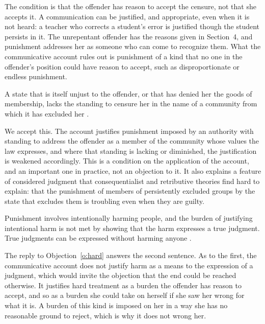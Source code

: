 \documentclass{situationist-preprint}
\begin{document}
\begin{reply}
The condition is that the offender has reason to accept the censure, not that she accepts it. A communication can be justified, and appropriate, even when it is not heard: a teacher who corrects a student's error is justified though the student persists in it. The unrepentant offender has the reasons given in Section~4, and punishment addresses her as someone who can come to recognize them. What the communicative account rules out is punishment of a kind that no one in the offender's position could have reason to accept, such as disproportionate or endless punishment.
\end{reply}

\begin{objection}[Standing]\label{o:standing}
A state that is itself unjust to the offender, or that has denied her the goods of membership, lacks the standing to censure her in the name of a community from which it has excluded her \citep{Duff2001}.
\end{objection}

\begin{reply}
We accept this. The account justifies punishment imposed by an authority with standing to address the offender as a member of the community whose values the law expresses, and where that standing is lacking or diminished, the justification is weakened accordingly. This is a condition on the application of the account, and an important one in practice, not an objection to it. It also explains a feature of considered judgment that consequentialist and retributive theories find hard to explain: that the punishment of members of persistently excluded groups by the state that excludes them is troubling even when they are guilty.
\end{reply}

\begin{objection}[Abolition]\label{o:boonin}
Punishment involves intentionally harming people, and the burden of justifying intentional harm is not met by showing that the harm expresses a true judgment. True judgments can be expressed without harming anyone \citep{Boonin2008}.
\end{objection}

\begin{reply}
The reply to Objection~\ref{o:hard} answers the second sentence. As to the first, the communicative account does not justify harm as a means to the expression of a judgment, which would invite the objection that the end could be reached otherwise. It justifies hard treatment as a burden the offender has reason to accept, and so as a burden she could take on herself if she saw her wrong for what it is. A burden of this kind is imposed on her in a way she has no reasonable ground to reject, which is why it does not wrong her.
\end{reply}
\end{document}
